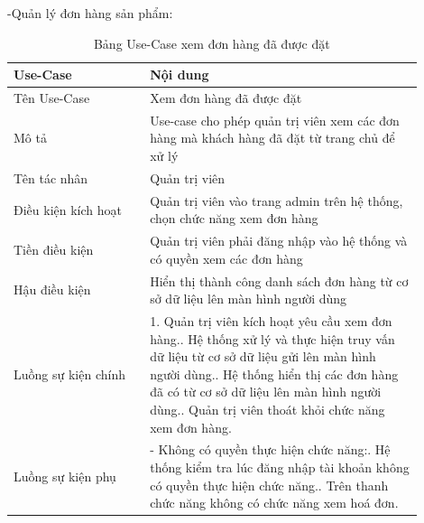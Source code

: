 -Quản lý đơn hàng sản phẩm:
\begin{longtable}[htp]{ |m{0.3\linewidth}|m{0.6\linewidth}|}
 \caption{Bảng Use-Case xem đơn hàng đã được đặt \label{listBill}}\\
 \hline
 Use-Case & Nội dung \\
 \hline
 Tên Use-Case & Xem đơn hàng đã được đặt \\
 \hline
 Mô tả & Use-case cho phép quản trị viên xem các đơn hàng mà khách hàng đã đặt từ trang chủ để xử lý\\
 \hline
 Tên tác nhân & Quản trị viên\\
 \hline
 Điều kiện kích hoạt & Quản trị viên vào trang admin trên hệ thống, chọn chức năng xem đơn hàng\\
 \hline
 Tiền điều kiện & Quản trị viên phải đăng nhập vào hệ thống và có quyền xem các đơn hàng\\
 \hline
 Hậu điều kiện & Hiển thị thành công danh sách đơn hàng từ cơ sở dữ liệu lên màn hình người dùng\\
 \hline
 Luồng sự kiện chính & 
 1. Quản trị viên kích hoạt yêu cầu xem đơn hàng.\newline
 2. Hệ thống xử lý và thực hiện truy vấn dữ liệu từ cơ sở dữ liệu gửi lên màn hình người dùng.\newline
 3. Hệ thống hiển thị các đơn hàng đã có từ cơ sở dữ liệu lên màn hình người dùng.\newline	
 4. Quản trị viên thoát khỏi chức năng xem đơn hàng.
 \\
 \hline
 Luồng sự kiện phụ & 
  - Không có quyền thực hiện chức năng:\newline
  1. Hệ thống kiểm tra lúc đăng nhập tài khoản không có quyền thực hiện chức năng.\newline
  2. Trên thanh chức năng không có chức năng xem hoá đơn.
 \\
 \hline
\end{longtable}
\newpage
